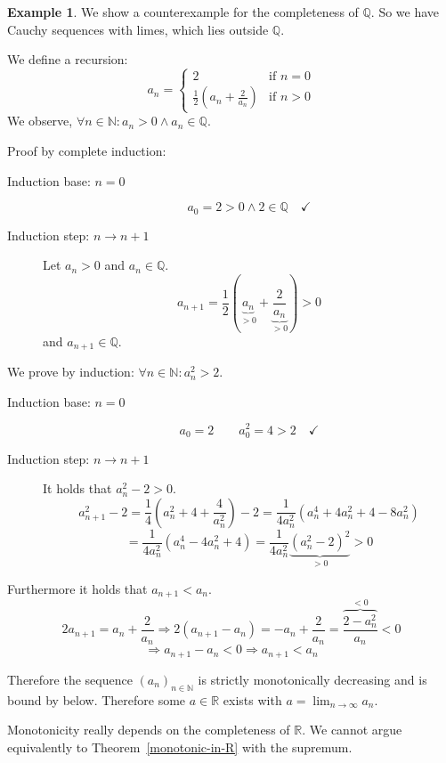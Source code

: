\documentclass[a4paper,landscape,twocolumn]{article}
\theoremstyle{definition}
\newtheorem{ex}{Example}
\newcommand\seq[1]{{\left(#1\right)}_{n \in \mathbb N}}
\begin{document}
\begin{ex}
  We show a counterexample for the completeness of $\mathbb Q$.
  So we have Cauchy sequences with limes, which lies outside $\mathbb Q$.

  We define a recursion:
  \[
    a_n = \begin{cases}
      2 & \text{if } n = 0 \\
      \frac12 \left(a_n + \frac2{a_n}\right) & \text{if } n > 0
    \end{cases}
  \]
  We observe, $\forall n \in \mathbb N: a_n > 0 \land a_n \in \mathbb Q$.

  Proof by complete induction:
  \begin{description}
    \item[Induction base: $n = 0$]
      \[ a_0 = 2 > 0 \land 2 \in \mathbb Q \quad \checkmark \]
    \item[Induction step: $n \rightarrow n + 1$]
      Let $a_n > 0$ and $a_n \in \mathbb Q$.
      \[ a_{n+1} = \frac12 \left(\underbrace{a_n}_{>0} + \underbrace{\frac2{a_n}}_{>0}\right) > 0 \]
      and $a_{n+1} \in \mathbb Q$.
  \end{description}

  We prove by induction: $\forall n \in \mathbb N: a_n^2 > 2$.
  \begin{description}
    \item[Induction base: $n = 0$]
      \[ a_0 = 2 \qquad a_0^2 = 4 > 2 \quad \checkmark \]
    \item[Induction step: $n \rightarrow n+1$]
      It holds that $a_n^2 - 2 > 0$.
      \[
          a_{n+1}^2 - 2
          = \frac14 \left(a_n^2 + 4 + \frac4{a_n^2}\right) - 2
          = \frac{1}{4a_n^2} \left(a_n^4 + 4a_n^2 + 4 - 8a_n^2\right)
      \] \[
          = \frac{1}{4a_n^2} \left(a_n^4 - 4a_n^2 + 4\right)
          = \frac{1}{4a_n^2} \underbrace{\left(a_n^2 - 2\right)^2}_{>0} > 0
      \]
  \end{description}

  Furthermore it holds that $a_{n+1} < a_n$.
  \[ 2a_{n+1} = a_n + \frac2{a_n} \Rightarrow 2 (a_{n+1} - a_n) = -a_n + \frac2{a_n} = \frac{\overbrace{2 - a_n^2}^{<0}}{a_n} < 0 \]
  \[ \Rightarrow a_{n+1} - a_n < 0 \Rightarrow a_{n+1} < a_n \]

  Therefore the sequence $\seq{a_n}$ is strictly monotonically decreasing and is bound by below.
  Therefore some $a \in \mathbb R$ exists with $a = \lim_{n\to\infty} a_n$.

  Monotonicity really depends on the completeness of $\mathbb R$.
  We cannot argue equivalently to Theorem~\ref{monotonic-in-R} with the supremum.


\end{ex}
\end{document}
